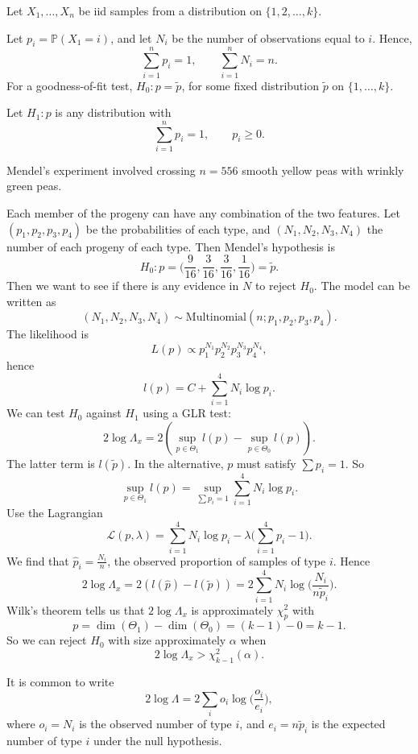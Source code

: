 \documentclass[12pt]{article}
\begin{document}
Let $X_1, \ldots, X_n$ be iid samples from a distribution on $\{1, 2, \ldots, k\}$.

Let $p_i = \mathbb{P}(X_1 = i)$, and let $N_i$ be the number of observations equal to $i$. Hence,
\[
\sum_{i = 1}^{n} p_i = 1, \qquad \sum_{i = 1}^{n} N_i = n.
\]
For a goodness-of-fit test, $H_0 : p = \tilde p$, for some fixed distribution $\tilde p$ on $\{1, \ldots, k\}$.

Let $H_1 : p$ is any distribution with
\[
\sum_{i = 1}^{n} p_i = 1, \qquad p_i \geq 0.
\]
\begin{exbox}
	Mendel's experiment involved crossing $n = 556$ smooth yellow peas with wrinkly green peas.

	Each member of the progeny can have any combination of the two features. Let $(p_1, p_2, p_3, p_4)$ be the probabilities of each type, and $(N_1, N_2, N_3, N_4)$ the number of each progeny of each type. Then Mendel's hypothesis is
	\[
	H_0 : p = \biggl( \frac{9}{16}, \frac{3}{16}, \frac{3}{16}, \frac{1}{16} \biggr) = \tilde p.
	\]
	Then we want to see if there is any evidence in $N$ to reject $H_0$. The model can be written as
	\[
		(N_1, N_2, N_3, N_4) \sim \mathrm{Multinomial}(n;p_1, p_2, p_3, p_4).
	\]
	The likelihood is
	\[
	L(p) \propto p_1^{N_1} p_2^{N_2} p_3^{N_3} p_4^{N_4},
	\]
	hence
	\[
	l(p) = C + \sum_{i=1}^{4} N_i \log p_i.
	\]
	We can test $H_0$ against $H_1$ using a GLR test:
	\[
	2 \log \Lambda_x = 2 ( \sup_{p \in \Theta_1} l(p) - \sup_{p \in \Theta_0}l(p)).
	\]
	The latter term is $l(\tilde p)$. In the alternative, $p$ must satisfy $\sum p_i = 1$. So
	\[
	\sup_{p \in \Theta_1} l(p) = \sup_{\sum p_i = 1} \sum_{i = 1}^{4} N_i \log p_i.
	\]
	Use the Lagrangian
	\[
	\mathcal{L}(p, \lambda) = \sum_{i=1}^{4} N_i \log p_i - \lambda\biggl( \sum_{i = 1}^{4} p_i - 1 \biggr).
	\]
	We find that $\hat p_i = \frac{N_i}{n}$, the observed proportion of samples of type $i$. Hence
	\[
	2 \log \Lambda_x = 2 (l(\hat p) - l(\tilde p)) = 2 \sum_{i = 1}^{4} N_i \log \biggl( \frac{N_i}{n \tilde p_i} \biggr).
	\]
	Wilk's theorem tells us that $2 \log \Lambda_x$ is approximately $\chi_p^2$ with
	\[
	p = \dim(\Theta_1) - \dim(\Theta_0) = (k-1) - 0 = k-1.
	\]
	So we can reject $H_0$ with size approximately $\alpha$ when
	\[
	2 \log \Lambda_x > \chi_{k-1}^2(\alpha).
	\]
\end{exbox}

It is common to write
\[
2 \log \Lambda = 2 \sum_{i} o_i \log \biggl( \frac{o_i}{e_i} \biggr),
\]
where $o_i = N_i$ is the observed number of type $i$, and $e_i = n \tilde p_i$ is the expected number of type $i$ under the null hypothesis.
\end{document}
